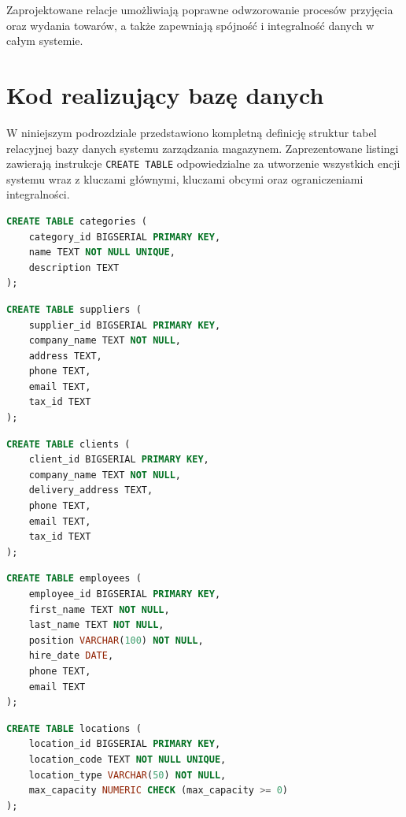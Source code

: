 Zaprojektowane relacje umożliwiają poprawne odwzorowanie procesów
przyjęcia oraz wydania towarów, a także zapewniają spójność
i integralność danych w całym systemie.

\section{Kod realizujący bazę danych}

W niniejszym podrozdziale przedstawiono kompletną definicję struktur
tabel relacyjnej bazy danych systemu zarządzania magazynem.
Zaprezentowane listingi zawierają instrukcje \texttt{CREATE TABLE}
odpowiedzialne za utworzenie wszystkich encji systemu wraz
z kluczami głównymi, kluczami obcymi oraz ograniczeniami integralności.

\begin{lstlisting}[language=SQL, caption={Definicja tabeli categories}]
CREATE TABLE categories (
    category_id BIGSERIAL PRIMARY KEY,
    name TEXT NOT NULL UNIQUE,
    description TEXT
);
\end{lstlisting}

\begin{lstlisting}[language=SQL, caption={Definicja tabeli suppliers}]
CREATE TABLE suppliers (
    supplier_id BIGSERIAL PRIMARY KEY,
    company_name TEXT NOT NULL,
    address TEXT,
    phone TEXT,
    email TEXT,
    tax_id TEXT
);
\end{lstlisting}

\begin{lstlisting}[language=SQL, caption={Definicja tabeli clients}]
CREATE TABLE clients (
    client_id BIGSERIAL PRIMARY KEY,
    company_name TEXT NOT NULL,
    delivery_address TEXT,
    phone TEXT,
    email TEXT,
    tax_id TEXT
);
\end{lstlisting}

\begin{lstlisting}[language=SQL, caption={Definicja tabeli employees}]
CREATE TABLE employees (
    employee_id BIGSERIAL PRIMARY KEY,
    first_name TEXT NOT NULL,
    last_name TEXT NOT NULL,
    position VARCHAR(100) NOT NULL,
    hire_date DATE,
    phone TEXT,
    email TEXT
);
\end{lstlisting}

\begin{lstlisting}[language=SQL, caption={Definicja tabeli locations}]
CREATE TABLE locations (
    location_id BIGSERIAL PRIMARY KEY,
    location_code TEXT NOT NULL UNIQUE,
    location_type VARCHAR(50) NOT NULL,
    max_capacity NUMERIC CHECK (max_capacity >= 0)
);
\end{lstlisting}

